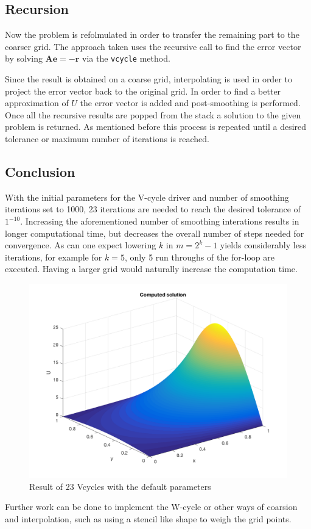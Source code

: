 \documentclass[main.tex]{subfiles}
\begin{document}
\subsection{Recursion}
Now the problem is refolmulated in order to transfer the remaining part to the coarser grid. The approach taken uses the recursive call to find the error vector by solving $\mathbf{A e} = \mathbf{-r}$ via the \texttt{vcycle} method.

Since the result is obtained on a coarse grid, interpolating is used in order to project the error vector back to the original grid. In order to find a better approximation of $U$ the error vector is added and post-smoothing is performed. Once all the recursive results are popped from the stack a solution to the given problem is returned. As mentioned before this process is repeated until a desired tolerance or maximum number of iterations is reached. 

\subsection{Conclusion}
With the initial parameters for the V-cycle driver and number of smoothing iterations set to 1000, 23 iterations are needed to reach the desired tolerance of $1^{-10}$. Increasing the aforementioned number of smoothing interations results in longer computational time, but decreases the overall number of steps needed for convergence. As can one expect lowering $k$ in $m=2^k - 1$ yields considerably less iterations, for example for $k=5$, only 5 run throughs of the for-loop are executed. Having a larger grid would naturally increase the computation time.

\begin{figure}[h]
    \centering
    \includegraphics[width=\textwidth]{../Figures/ex33.png}
    \caption{Result of 23 Vcycles with the default parameters}
\end{figure}

Further work can be done to implement the W-cycle or other ways of coarsion and interpolation, such as using a stencil like shape to weigh the grid points.
    
\end{document}
